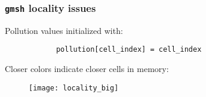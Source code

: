 \begin{frame}[fragile]
	\frametitle{\texttt{gmsh} locality issues}

	Pollution values initialized with:
	\begin{center}
		\begin{verbatim}
			pollution[cell_index] = cell_index
		\end{verbatim}
	\end{center}
	\pause

	Closer colors indicate closer cells in memory:

	\begin{figure}
		\centering
		\texttt{[image: locality\_big]}
	\end{figure}
\end{frame}

